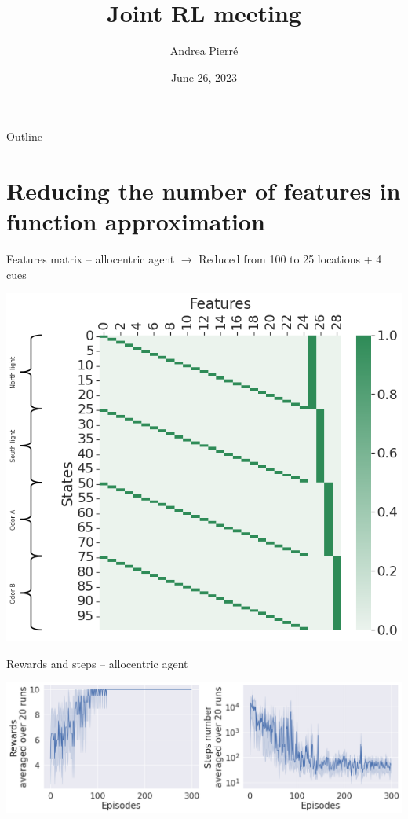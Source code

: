 \documentclass[bigger]{beamer}
\author{Andrea Pierré}
\date{June 26, 2023}
\title{Joint RL meeting}
\institute{Brown University}
\begin{document}
\maketitle
\begin{frame}[plain]{Outline}
\tableofcontents
\end{frame}

\section{Reducing the number of features in function approximation}
\label{sec:org3064f29}
\begin{frame}[label={sec:org8335579}]{Features matrix -- allocentric agent}
\(\to\) Reduced from 100 to 25 locations + 4 cues
\begin{center}
\includegraphics[height=0.8\textheight]{img/FuncApprox-allo-features-matrix.png}
\end{center}
\end{frame}
\begin{frame}[label={sec:org2b17af7}]{Rewards and steps -- allocentric agent}
\begin{center}
\includegraphics[width=\textwidth]{img/FuncApprox-allo-rewards-steps.png}
\end{center}
\end{frame}
\end{document}
